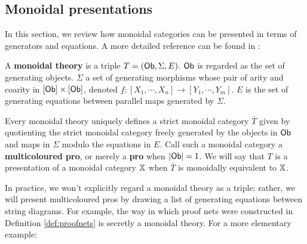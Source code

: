 \subsection{Monoidal presentations}
In this section, we review how monoidal categories can be presented in terms of generators and equations. A more detailed reference can be found in \cite{ih}:





\begin{definition}
\label{def:monoidaltheory}


A {\bf monoidal theory} is a triple $T=({\sf Ob},\Sigma ,E )$.   ${\sf Ob}$ is regarded as the set of generating objects. $\Sigma$ a set of generating morphisms whose pair of arity and coarity  in $[{\sf Ob}]\times [{\sf Ob}]$, denoted $f:[X_1,\cdots, X_n]\to [Y_1,\cdots, Y_m]$. $E$  is the set of generating equations between parallel maps generated by $\Sigma$.

Every monoidal theory uniquely defines a strict monoidal category $\bar T$ given by quotienting the strict monoidal category freely generated by the objects in $\sf Ob$ and maps in $\Sigma$ modulo the equations in $E$.  Call such a monoidal category a {\bf multicoloured pro}, or merely a {\bf pro} when $|{\sf Ob}|=1$.  We will say that $T$ is a presentation of a monoidal category $\mathbb{X}$ when $\bar T$ is monoidally equivalent to $\mathbb{X}$.
\end{definition}



 In practice, we won't explicitly regard a  monoidal theory as a triple; rather, we will present multicoloured pros by drawing a list of generating equations between string diagrams.
For example, the way in which proof nets were constructed in Definition \ref{def:proofnets} is secretly a monoidal theory.
For a more elementary example:

